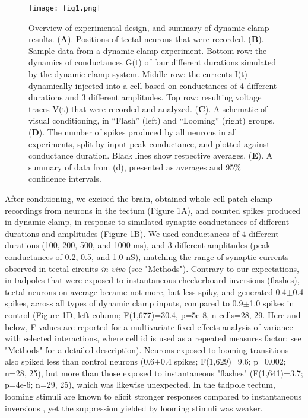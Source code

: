 \documentclass{article}
\begin{document}
\begin{figure*}
\texttt{[image: fig1.png]}
\caption{
Overview of experimental design, and summary of dynamic clamp results. (\textbf{A}). Positions of tectal neurons that were recorded. (\textbf{B}). Sample data from a dynamic clamp experiment. Bottom row: the dynamics of conductances G(t) of four different durations simulated by the dynamic clamp system. Middle row: the currents I(t) dynamically injected into a cell based on conductances of 4 different durations and 3 different amplitudes. Top row: resulting voltage traces V(t) that were recorded and analyzed. (\textbf{C}). A schematic of visual conditioning, in “Flash” (left) and “Looming” (right) groups. (\textbf{D}). The number of spikes produced by all neurons in all experiments, split by input peak conductance, and plotted against conductance duration. Black lines show respective averages. (\textbf{E}). A summary of data from (d), presented as averages and 95\% confidence intervals.}
\end{figure*}

After conditioning, we excised the brain, obtained whole cell patch clamp recordings from neurons in the tectum (Figure 1A), and counted spikes produced in dynamic clamp, in response to simulated synaptic conductances of different durations and amplitudes (Figure 1B). We used conductances of 4 different durations (100, 200, 500, and 1000 ms), and 3 different amplitudes (peak conductances of 0.2, 0.5, and 1.0 nS), matching the range of synaptic currents observed in tectal circuits \textit{in vivo} (see "Methods"). Contrary to our expectations, in tadpoles that were exposed to instantaneous checkerboard inversions (flashes), tectal neurons on average became not more, but less spiky, and generated 0.4$\pm$0.4 spikes, across all types of dynamic clamp inputs, compared to 0.9$\pm$1.0 spikes in control (Figure 1D, left column; F(1,677)=30.4, p=5e-8, n cells=28, 29. Here and below, F-values are reported for a multivariate fixed effects analysis of variance with selected interactions, where cell id is used as a repeated measures factor; see "Methods" for a detailed description). Neurons exposed to looming transitions also spiked less than control neurons (0.6$\pm$0.4 spikes; F(1,629)=9.6; p=0.002; n=28, 25), but more than those exposed to instantaneous "flashes" (F(1,641)=3.7; p=4e-6; n=29, 25), which was likewise unexpected. In the tadpole tectum, looming stimuli are known to elicit stronger responses compared to instantaneous inversions \citep{khakhalin2014}, yet the suppression yielded by looming stimuli was weaker.
\end{document}
